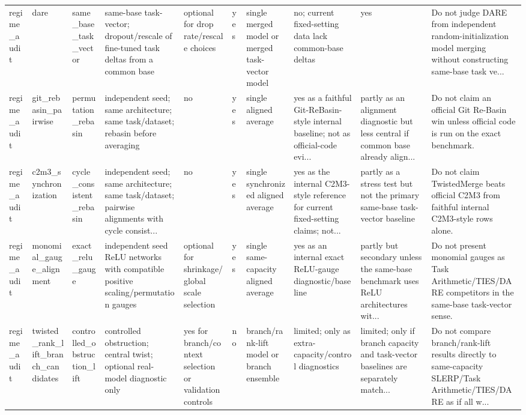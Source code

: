 \begin{tabular}{llllllllll}
regime\_audit & dare & same\_base\_task\_vector & same-base task-vector; dropout/rescale of fine-tuned task deltas from a common base & optional for drop rate/rescale choices & yes & single merged model or merged task-vector model & no; current fixed-setting data lack common-base deltas & yes & Do not judge DARE from independent random-initialization model merging without constructing same-base task ve... \\
regime\_audit & git\_rebasin\_pairwise & permutation\_rebasin & independent seed; same architecture; same task/dataset; rebasin before averaging & no & yes & single aligned average & yes as a faithful Git-ReBasin-style internal baseline; not as official-code evi... & partly as an alignment diagnostic but less central if common base already align... & Do not claim an official Git Re-Basin win unless official code is run on the exact benchmark. \\
regime\_audit & c2m3\_synchronization & cycle\_consistent\_rebasin & independent seed; same architecture; same task/dataset; pairwise alignments with cycle consist... & no & yes & single synchronized aligned average & yes as the internal C2M3-style reference for current fixed-setting claims; not... & partly as a stress test but not the primary same-base task-vector baseline & Do not claim TwistedMerge beats official C2M3 from faithful internal C2M3-style rows alone. \\
regime\_audit & monomial\_gauge\_alignment & exact\_relu\_gauge & independent seed ReLU networks with compatible positive scaling/permutation gauges & optional for shrinkage/global scale selection & yes & single same-capacity aligned average & yes as an internal exact ReLU-gauge diagnostic/baseline & partly but secondary unless the same-base benchmark uses ReLU architectures wit... & Do not present monomial gauges as Task Arithmetic/TIES/DARE competitors in the same-base task-vector sense. \\
regime\_audit & twisted\_rank\_lift\_branch\_candidates & controlled\_obstruction\_lift & controlled obstruction; central twist; optional real-model diagnostic only & yes for branch/context selection or validation controls & no & branch/rank-lift model or branch ensemble & limited; only as extra-capacity/control diagnostics & limited; only if branch capacity and task-vector baselines are separately match... & Do not compare branch/rank-lift results directly to same-capacity SLERP/Task Arithmetic/TIES/DARE as if all w... \\
\bottomrule
\end{tabular}
